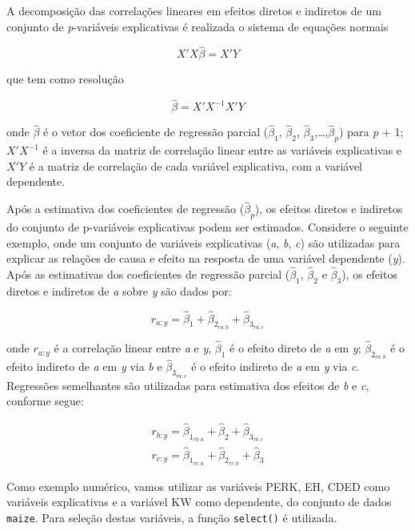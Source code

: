 \documentclass[
]{book}
\begin{document}
A decomposição das correlações lineares em efeitos diretos e indiretos de um conjunto de \emph{p}-variáveis explicativas é realizada o sistema de equações normais 

\[
X'X\hat \beta = X'Y
\]

que tem como resolução

\[
\hat \beta = X'X^{-1} X'Y
\]

onde \(\hat \beta\) é o vetor dos coeficiente de regressão parcial (\(\hat \beta_1\), \(\hat \beta_2\), \(\hat \beta_3\),\ldots,\(\hat \beta_p\)) para \emph{p} + 1; \(X'X^{-1}\) é a inversa da matriz de correlação linear entre as variáveis explicativas e \(X'Y\) é a matriz de correlação de cada variável explicativa, com a variável dependente.

Após a estimativa dos coeficientes de regressão (\(\hat \beta_p\)), os efeitos diretos e indiretos do conjunto de p-variáveis explicativas podem ser estimados. Considere o seguinte exemplo, onde um conjunto de variáveis explicativas (\emph{a}, \emph{b}, \emph{c}) são utilizadas para explicar as relações de causa e efeito  na resposta de uma variável dependente (\emph{y}). Após as estimativas dos coeficientes de regressão parcial (\(\hat \beta_1\), \(\hat \beta_2\) e \(\hat \beta_3\)), os efeitos diretos e indiretos de \emph{a} sobre \emph{y} são dados por:

\[
r_{a:y} = \hat \beta_1 + \hat \beta_{2_{ra:b}} + \hat \beta_{3_{ra:c}}
\]

onde \(r_{a:y}\) é a correlação linear entre \emph{a} e \emph{y}, \(\hat \beta_1\) é o efeito direto de \emph{a} em \emph{y}; \(\hat \beta_{2_{ra:b}}\) é o efeito indireto de \emph{a} em \emph{y} via \emph{b} e \(\hat \beta_{3_{ra:c}}\) é o efeito indireto de \emph{a} em \emph{y} via \emph{c}. Regressões semelhantes são utilizadas para estimativa dos efeitos de \emph{b} e \emph{c}, conforme segue:

\begin{gather*}
r_{b:y} = \hat \beta_{1_{rb:a}} + \hat \beta_2 + \hat \beta_{3_{rb:c}}\\
r_{c:y} = \hat \beta_{1_{rc:a}} + \hat \beta_{2_{rc:b}} + \hat \beta_3
\end{gather*}

Como exemplo numérico, vamos utilizar as variáveis PERK, EH, CDED como variáveis explicativas e a variável KW como dependente, do conjunto de dados \texttt{maize}. Para seleção destas variáveis, a função \texttt{select()} é utilizada.
\end{document}
